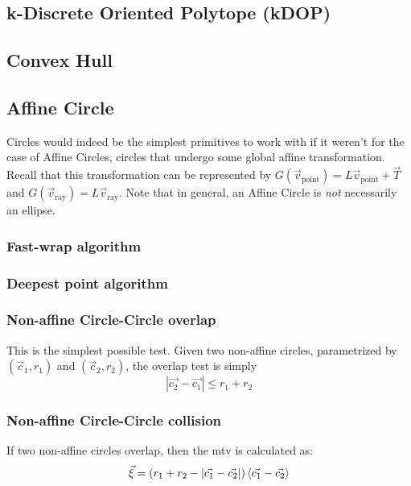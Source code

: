 \documentclass[10pt]{report}
\begin{document}
\subsection{k-Discrete Oriented Polytope (kDOP)}

\subsection{Convex Hull}

\subsection{Affine Circle}
Circles would indeed be the simplest primitives to work with if it weren't for the case of Affine Circles, circles that undergo some global affine transformation. Recall that this transformation can be represented by $G(\vec{v}_{\mbox{point}})=L\vec{v}_{\mbox{point}}+\vec{T}$ and $G(\vec{v}_{\mbox{ray}})=L\vec{v}_{\mbox{ray}}$. Note that in general, an Affine Circle is \textit{not} necessarily an ellipse.

\subsubsection{Fast-wrap algorithm}

\subsubsection{Deepest point algorithm}

\subsubsection{Non-affine Circle-Circle overlap}
This is the simplest possible test. Given two non-affine circles, parametrized by $(\vec{c}_1,r_1)$ and $(\vec{c}_2,r_2)$, the overlap test is simply
\begin{equation}|\vec{c_2}-\vec{c_1}|\leq r_1+r_2\end{equation}

\subsubsection{Non-affine Circle-Circle collision}
If two non-affine circles overlap, then the mtv is calculated as:
\begin{equation}\vec{\xi}=(r_1+r_2-|\vec{c_1}-\vec{c_2}|)\braket{\vec{c_1}-\vec{c_2}}\end{equation}
\end{document}
